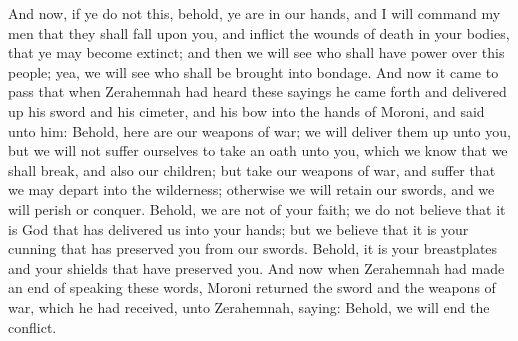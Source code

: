 And now, if ye do not this, behold, ye are in our hands, and I will command my men that they shall fall upon you, and inflict the wounds of death in your bodies, that ye may become extinct; and then we will see who shall have power over this people; yea, we will see who shall be brought into bondage.
\bverse \iffalse And now it came to pass that when Zerahemnah had heard these sayings he came forth and delivered up his sword and his cimeter, and his bow into the hands of Moroni, and said unto him: Behold, here are our weapons of war; we will deliver them up unto you, but we will not suffer ourselves to take an oath unto you, which we know that we shall break, and also our children; but take our weapons of war, and suffer that we may depart into the wilderness; otherwise we will retain our swords, and we will perish or conquer. \fi
And now it came to pass that when Zerahemnah had heard these sayings he came forth and delivered up his sword and his cimeter, and his bow into the hands of Moroni, and said unto him: Behold, here are our weapons of war; we will deliver them up unto you, but we will not suffer ourselves to take an oath unto you, which we know that we shall break, and also our children; but take our weapons of war, and suffer that we may depart into the wilderness; otherwise we will retain our swords, and we will perish or conquer.
\bverse \iffalse Behold, we are not of your faith; we do not believe that it is God that has delivered us into your hands; but we believe that it is your cunning that has preserved you from our swords. Behold, it is your breastplates and your shields that have preserved you. \fi
Behold, we are not of your faith; we do not believe that it is God that has delivered us into your hands; but we believe that it is your cunning that has preserved you from our swords. Behold, it is your breastplates and your shields that have preserved you.
\bverse \iffalse And now when Zerahemnah had made an end of speaking these words, Moroni returned the sword and the weapons of war, which he had received, unto Zerahemnah, saying: Behold, we will end the conflict. \fi
And now when Zerahemnah had made an end of speaking these words, Moroni returned the sword and the weapons of war, which he had received, unto Zerahemnah, saying: Behold, we will end the conflict.
\bverse \iffalse Now I cannot recall the words which I have spoken, therefore as the Lord liveth, ye shall not depart except ye depart with an oath that ye will not return again against us to war. Now as ye are in our hands we will spill your blood upon the ground, or ye shall submit to the conditions which I have proposed. \fi
